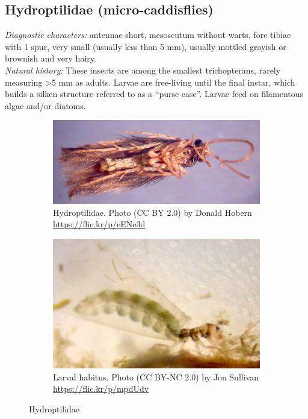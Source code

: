 \documentclass[letterpaper, 11pt]{article}
\begin{document}
\subsection{Hydroptilidae (micro-caddisflies)}
\noindent{}\textit{Diagnostic characters:} antennae short, mesoscutum without warts, fore tibiae with 1 spur, very small (usually less than 5 mm), usually mottled grayish or brownish and very hairy.\\

\noindent{}\textit{Natural history:} These insects are among the smallest trichopterans, rarely measuring \textgreater5 mm as adults. Larvae are free-living until the final instar, which builds a silken structure referred to as a ``purse case''. Larvae feed on filamentous algae and/or diatoms.

\begin{figure}[ht!]
    \centering
    \begin{subfigure}[ht!]{0.5\textwidth}
        \includegraphics[width=\textwidth]{HydroptilidHabitus}
        \caption{Hydroptilidae. Photo (CC BY 2.0) by Donald Hobern \url{https://flic.kr/p/eENe3d}}
        \label{fig:hydrop1}
    \end{subfigure}
    \hfill %
    \begin{subfigure}[ht!]{0.45\textwidth}
        \includegraphics[width=\textwidth]{HydroptilidLarva}
        \caption{Larval habitus. Photo (CC BY-NC 2.0) by Jon Sullivan \url{https://flic.kr/p/mpdUdv}}
        \label{fig:hydroptilid2}
    \end{subfigure}
    \caption{Hydroptilidae}\label{fig:hydroptilids}
\end{figure}
\end{document}
